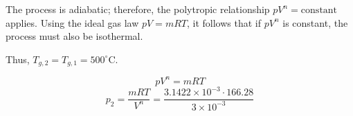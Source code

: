 The process is adiabatic; therefore, the polytropic relationship \( pV^n = \text{constant} \) applies. Using the ideal gas law \( pV = mRT \), it follows that if \( pV^n \) is constant, the process must also be isothermal.  

Thus, \( T_{g,2} = T_{g,1} = 500^\circ\text{C} \).  

\[
pV^n = mRT
\]  
\[
p_2 = \frac{mRT}{V^n} = \frac{3.1422 \times 10^{-3} \cdot 166.28}{3 \times 10^{-3}}
\]